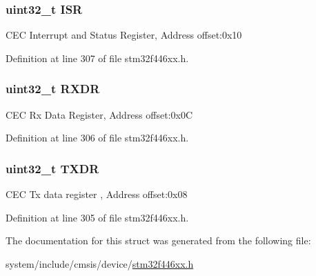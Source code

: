 \subsubsection[{\texorpdfstring{I\+SR}{ISR}}]{ uint32\+\_\+t I\+SR}\hypertarget{struct_c_e_c___type_def_ab3c49a96815fcbee63d95e1e74f20e75}{}\label{struct_c_e_c___type_def_ab3c49a96815fcbee63d95e1e74f20e75}
C\+EC Interrupt and Status Register, Address offset\+:0x10 

Definition at line 307 of file stm32f446xx.\+h.

\subsubsection[{\texorpdfstring{R\+X\+DR}{RXDR}}]{ uint32\+\_\+t R\+X\+DR}\hypertarget{struct_c_e_c___type_def_a9bf29a9104cb5569823ab892174f9c8c}{}\label{struct_c_e_c___type_def_a9bf29a9104cb5569823ab892174f9c8c}
C\+EC Rx Data Register, Address offset\+:0x0C 

Definition at line 306 of file stm32f446xx.\+h.

\subsubsection[{\texorpdfstring{T\+X\+DR}{TXDR}}]{ uint32\+\_\+t T\+X\+DR}\hypertarget{struct_c_e_c___type_def_ad7e8d785fff2acfeb8814e43bda8dd72}{}\label{struct_c_e_c___type_def_ad7e8d785fff2acfeb8814e43bda8dd72}
C\+EC Tx data register , Address offset\+:0x08 

Definition at line 305 of file stm32f446xx.\+h.



The documentation for this struct was generated from the following file\+:\begin{DoxyCompactItemize}
\item 
system/include/cmsis/device/\hyperlink{stm32f446xx_8h}{stm32f446xx.\+h}\end{DoxyCompactItemize}
